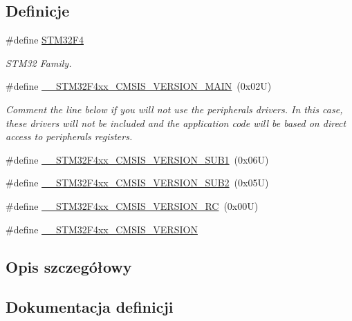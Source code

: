 \subsection*{Definicje}
\begin{DoxyCompactItemize}
\item 
\#define \hyperlink{group___library__configuration__section_ga84d985cb5667176091597f71ffdb9307}{S\+T\+M32\+F4}
\begin{DoxyCompactList}\small\item\em S\+T\+M32 Family. \end{DoxyCompactList}\item 
\#define \hyperlink{group___library__configuration__section_gaf867da11218022a14245b854f6be6a40}{\+\_\+\+\_\+\+S\+T\+M32\+F4xx\+\_\+\+C\+M\+S\+I\+S\+\_\+\+V\+E\+R\+S\+I\+O\+N\+\_\+\+M\+A\+IN}~(0x02\+U)
\begin{DoxyCompactList}\small\item\em Comment the line below if you will not use the peripherals drivers. In this case, these drivers will not be included and the application code will be based on direct access to peripherals registers. \end{DoxyCompactList}\item 
\#define \hyperlink{group___library__configuration__section_ga4841e20bc5159a594936808c113ae3bc}{\+\_\+\+\_\+\+S\+T\+M32\+F4xx\+\_\+\+C\+M\+S\+I\+S\+\_\+\+V\+E\+R\+S\+I\+O\+N\+\_\+\+S\+U\+B1}~(0x06\+U)
\item 
\#define \hyperlink{group___library__configuration__section_ga6ccbf6336bfb67bf4daeb05eba18a5e3}{\+\_\+\+\_\+\+S\+T\+M32\+F4xx\+\_\+\+C\+M\+S\+I\+S\+\_\+\+V\+E\+R\+S\+I\+O\+N\+\_\+\+S\+U\+B2}~(0x05\+U)
\item 
\#define \hyperlink{group___library__configuration__section_gafbd304f122892833ce0d4daa3dc4ff13}{\+\_\+\+\_\+\+S\+T\+M32\+F4xx\+\_\+\+C\+M\+S\+I\+S\+\_\+\+V\+E\+R\+S\+I\+O\+N\+\_\+\+RC}~(0x00\+U)
\item 
\#define \hyperlink{group___library__configuration__section_ga9e8a65cc42b85335938665a12c37cacf}{\+\_\+\+\_\+\+S\+T\+M32\+F4xx\+\_\+\+C\+M\+S\+I\+S\+\_\+\+V\+E\+R\+S\+I\+ON}
\end{DoxyCompactItemize}


\subsection{Opis szczegółowy}


\subsection{Dokumentacja definicji}
\mbox{\label{group___library__configuration__section_ga9e8a65cc42b85335938665a12c37cacf}} 
